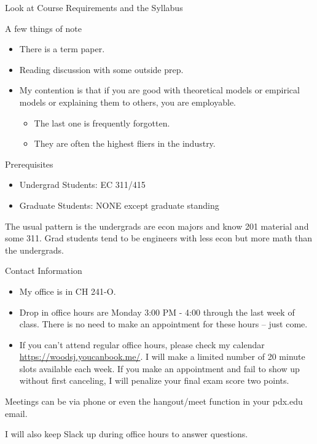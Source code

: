 \documentclass[
  ignorenonframetext,
]{beamer}
\providecommand{\tightlist}{%
  \setlength{\itemsep}{0pt}\setlength{\parskip}{0pt}}
\begin{document}
\begin{frame}{Look at Course Requirements and the Syllabus}
\protect\hypertarget{look-at-course-requirements-and-the-syllabus}{}

A few things of note

\begin{itemize}
\tightlist
\item
  There is a term paper.
\item
  Reading discussion with some outside prep.
\item
  My contention is that if you are good with theoretical models or
  empirical models or explaining them to others, you are employable.

  \begin{itemize}
  \tightlist
  \item
    The last one is frequently forgotten.
  \item
    They are often the highest fliers in the industry.
  \end{itemize}
\end{itemize}

\end{frame}

\begin{frame}{Prerequisites}
\protect\hypertarget{prerequisites}{}

\begin{itemize}
\tightlist
\item
  Undergrad Students: EC 311/415
\item
  Graduate Students: NONE except graduate standing
\end{itemize}

The usual pattern is the undergrads are econ majors and know 201
material and some 311. Grad students tend to be engineers with less econ
but more math than the undergrads.

\end{frame}

\begin{frame}{Contact Information}
\protect\hypertarget{contact-information}{}

\begin{itemize}
\tightlist
\item
  My office is in CH 241-O.
\item
  Drop in office hours are Monday 3:00 PM - 4:00 through the last week
  of class. There is no need to make an appointment for these hours --
  just come.
\item
  If you can't attend regular office hours, please check my calendar
  \url{https://woodsj.youcanbook.me/}. I will make a limited number of
  20 minute slots available each week. If you make an appointment and
  fail to show up without first canceling, I will penalize your final
  exam score two points.
\end{itemize}

Meetings can be via phone or even the hangout/meet function in your
pdx.edu email.

I will also keep Slack up during office hours to answer questions.

\end{frame}
\end{document}
